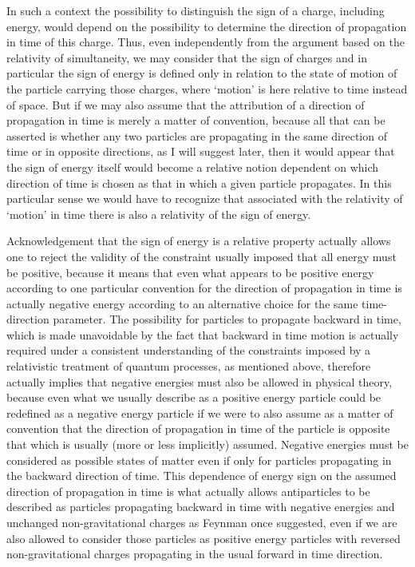 \documentclass[notitlepage,12pt]{report}
\begin{document}
In such a context the possibility to distinguish the sign of a charge, including energy, would depend on the possibility to determine the direction of propagation in time of this charge. Thus, even independently from the argument based on the relativity of simultaneity, we may consider that the sign of charges and in particular the sign of energy is defined only in relation to the state of motion of the particle carrying those charges, where `motion' is here relative to time instead of space. But if we may also assume that the attribution of a direction of propagation in time is merely a matter of convention, because all that can be asserted is whether any two particles are propagating in the same direction of time or in opposite directions, as I will suggest later, then it would appear that the sign of energy itself would become a relative notion dependent on which direction of time is chosen as that in which a given particle propagates. In this particular sense we would have to recognize that associated with the relativity of `motion' in time there is also a relativity of the sign of energy.

Acknowledgement that the sign of energy is a relative property actually allows one to reject the validity of the constraint usually imposed that all energy must be positive, because it means that even what appears to be positive energy according to one particular convention for the direction of propagation in time is actually negative energy according to an alternative choice for the same time-direction parameter. The possibility for particles to propagate backward in time, which is made unavoidable by the fact that backward in time motion is actually required under a consistent understanding of the constraints imposed by a relativistic treatment of quantum processes, as mentioned above, therefore actually implies that negative energies must also be allowed in physical theory, because even what we usually describe as a positive energy particle could be redefined as a negative energy particle if we were to also assume as a matter of convention that the direction of propagation in time of the particle is opposite that which is usually (more or less implicitly) assumed. Negative energies must be considered as possible states of matter even if only for particles propagating in the backward direction of time. This dependence of energy sign on the assumed direction of propagation in time is what actually allows antiparticles to be described as particles propagating backward in time with negative energies and unchanged non-gravitational charges as Feynman once suggested, even if we are also allowed to consider those particles as positive energy particles with reversed non-gravitational charges propagating in the usual forward in time direction.
\end{document}
